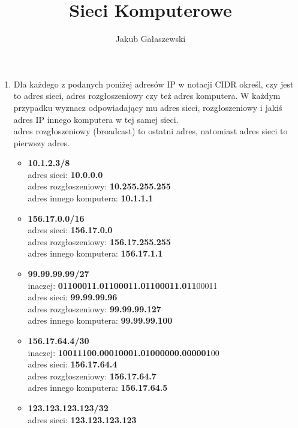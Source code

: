 \documentclass{article}[A4]
\title{Sieci Komputerowe}
\author{Jakub Gałaszewski}
\begin{document}
\maketitle
\begin{enumerate}
	\item{Dla każdego z podanych poniżej adresów IP w notacji CIDR określ, czy jest to adres sieci, adres rozgłoszeniowy czy też adres komputera. W każdym przypadku wyznacz odpowiadający mu adres sieci, rozgłoszeniowy i jakiś adres IP innego komputera w tej samej sieci.}\\
			adres rozgłoszeniowy (broadcast) to ostatni adres, natomiast adres sieci to pierwszy adres.
	\begin{itemize}[label=$\blacktriangleright$]
	\item \textbf{10.1.2.3/8}\\
	\null \quad adres sieci: \textbf{10.0.0.0}\\
	\null \quad adres rozgłoszeniowy: \textbf{10.255.255.255}\\
	\null \quad adres innego komputera: \textbf{10.1.1.1}
	\item \textbf{156.17.0.0/16}\\
	\null \quad adres sieci: \textbf{156.17.0.0}\\
	\null \quad adres rozgłoszeniowy: \textbf{156.17.255.255}\\
	\null \quad adres innego komputera: \textbf{156.17.1.1}
	\item \textbf{99.99.99.99/27}\\
	\null \quad inaczej: \textbf{01100011.01100011.01100011.011}00011\\
	\null \quad adres sieci: \textbf{99.99.99.96}\\
	\null \quad adres rozgłoszeniowy: \textbf{99.99.99.127}\\
	\null \quad adres innego komputera: \textbf{99.99.99.100}
	\item \textbf{156.17.64.4/30}\\
	\null \quad inaczej: \textbf{10011100.00010001.01000000.000001}00\\
	\null \quad adres sieci: \textbf{156.17.64.4}\\
	\null \quad adres rozgłoszeniowy: \textbf{156.17.64.7}\\
	\null \quad adres innego komputera: \textbf{156.17.64.5}
	\item \textbf{123.123.123.123/32}\\
	\null \quad adres sieci: \textbf{123.123.123.123}\\

\end{itemize}
\end{enumerate}
\end{document}
